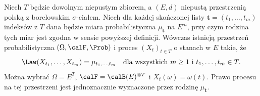 \begin{twierdzenie}
\label{thm:kol-ext}
Niech $T$ będzie dowolnym niepustym zbiorem, a $(E,d)$
niepustą przestrzenią polską z borelowskim $\sigma$-ciałem.
Niech dla każdej skończonej listy $\mathbf t=(t_1,\ldots,t_m)$
indeksów z $T$ dana będzie miara probabilistyczna
$\mu_{\mathbf t}$ na $E^m$, przy czym rodzina tych miar
jest zgodna w sensie powyższej definicji.
Wówczas istnieją przestrzeń probabilistyczna
$(\Omega,\calF,\Prob)$ i proces
$(X_t)_{t\in T}$ o stanach w $E$ takie, że
\[
\Law(X_{t_1},\ldots,X_{t_m})=\mu_{t_1,\ldots,t_m}
\quad\text{dla wszystkich }m\ge1\text{ i }t_1,\ldots,t_m\in T.
\]
Można wybrać $\Omega=E^T$,
$\calF=\calB(E)^{\otimes T}$ i $X_t(\omega)=\omega(t)$.
Prawo procesu na tej przestrzeni jest jednoznacznie wyznaczone
przez rodzinę $\mu_{\mathbf t}$.
\end{twierdzenie}

